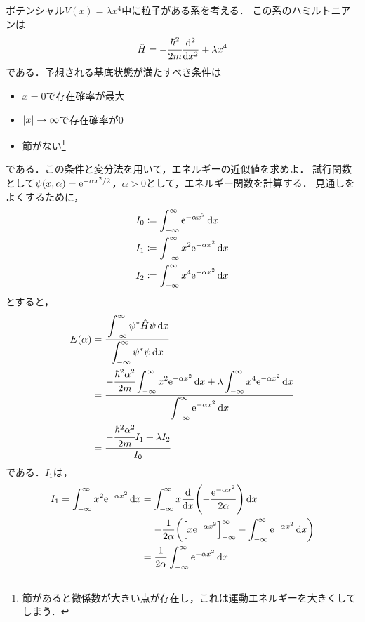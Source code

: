 \documentclass{report}
\begin{document}
  \begin{myex}{}{}
    ポテンシャル$V(x)=\lambda x^4$中に粒子がある系を考える．
    この系のハミルトニアンは
    \begin{align}
      \hat{H} = -\cfrac{\hbar^2}{2m}\dv[2]{x} + \lambda x^4
    \end{align}
    である．予想される基底状態が満たすべき条件は
    \begin{itemize}
      \item $x = 0$で存在確率が最大
      \item $\abs{x} \to \infty$で存在確率が0
      \item 節がない\footnote{節があると微係数が大きい点が存在し，これは運動エネルギーを大きくしてしまう．}
    \end{itemize}
    である．この条件と変分法を用いて，エネルギーの近似値を求めよ．
    \tcblower
    試行関数として$\psi(x, \alpha) = \mathrm{e}^{-\alpha x^2/2}$，$\alpha > 0$として，エネルギー関数を計算する．
    見通しをよくするために，
    \begin{align}
      I_0 &\coloneqq \int_{-\infty}^{\infty}\mathrm{e}^{-\alpha x^2} \dd{x} \\ 
      I_1 &\coloneqq \int_{-\infty}^{\infty}x^2\mathrm{e}^{-\alpha x^2} \dd{x} \\ 
      I_2 &\coloneqq \int_{-\infty}^{\infty}x^4\mathrm{e}^{-\alpha x^2} \dd{x} 
    \end{align}
    とすると，
    \begin{align}
      E(\alpha) &= \cfrac{\displaystyle\int_{-\infty}^{\infty} \psi^{*}\hat{H}\psi \dd{x}}{\displaystyle\int_{-\infty}^{\infty} \psi^{*}\psi \dd{x}} \\ 
      &= \frac{\displaystyle -\cfrac{\hbar^2\alpha^2}{2m}\int_{-\infty}^{\infty}x^2\mathrm{e}^{-\alpha x^2} \dd{x} + \lambda\int_{-\infty}^{\infty}x^4\mathrm{e}^{-\alpha x^2}\dd{x}}{\displaystyle\int_{-\infty}^{\infty}\mathrm{e}^{-\alpha x^2}\dd{x}} \\
      &= \frac{-\cfrac{\hbar^2\alpha^2}{2m}I_1 + \lambda I_2}{I_0}\label{E1}
    \end{align}
    である．$I_1$は，
    \begin{align}
      I_1 = \int_{-\infty}^{\infty}x^2\e^{-\alpha x^2}\dd{x} &= \int_{-\infty}^{\infty}x\dv{x}\qty(-\frac{\e^{-\alpha x^2}}{2\alpha}) \dd{x} \\ 
      &= -\frac{1}{2\alpha}\qty(\qty[x\e^{-\alpha x^2}]_{-\infty}^{\infty} - \int_{-\infty}^{\infty}\e^{-\alpha x^2}\dd{x}) \\ 
      &= \frac{1}{2\alpha} \int_{-\infty}^{\infty}\e^{-\alpha x^2}\dd{x} \\ 

\end{align}
\end{myex}
\end{document}
